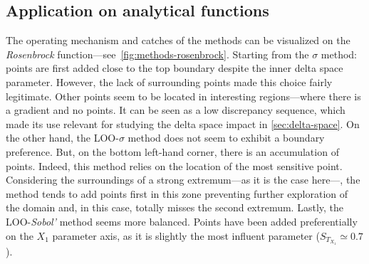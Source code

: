 \subsection{Application on analytical functions}
\label{sec:res-functions}

The operating mechanism and catches of the methods can be visualized on the \textit{Rosenbrock} function---see~\cref{fig:methods-rosenbrock}. Starting from the $\sigma$ method: points are first added close to the top boundary despite the inner delta space parameter. However, the lack of surrounding points made this choice fairly legitimate. Other points seem to be located in interesting regions---where there is a gradient and no points. It can be seen as a low discrepancy sequence, which made its use relevant for studying the delta space impact in \cref{sec:delta-space}. On the other hand, the LOO-$\sigma$ method does not seem to exhibit a boundary preference. But, on the bottom left-hand corner, there is an accumulation of points. Indeed, this method relies on the location of the most sensitive point. Considering the surroundings of a strong extremum---as it is the case here---, the method tends to add points first in this zone preventing further exploration of the domain and, in this case, totally misses the second extremum. Lastly, the LOO-\textit{Sobol'} method seems more balanced. Points have been added preferentially on the $X_1$ parameter axis, as it is slightly the most influent parameter ($S_{T_{X_1}} \simeq 0.7$). 


